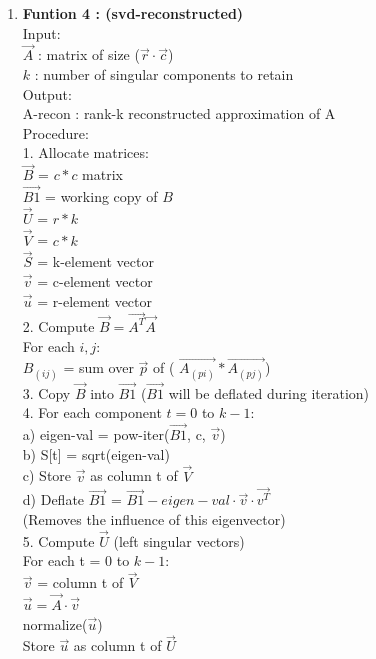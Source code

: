 \documentclass[journal,12pt,onecolumn]{IEEEtran}
\theoremstyle{remark}
\begin{document}
\begin{justify}
\begin{enumerate}
\item \textbf{Funtion 4 : (svd-reconstructed)}\\
Input:\\
  $\vec{A}$ : matrix of size ($\vec{r} \cdot \vec{c}$)\\
  $k$ : number of singular components to retain\\

Output:\\
  A-recon : rank-k reconstructed approximation of A\\
Procedure:\\
1. Allocate matrices:\\
      $\vec{B}$  = $c*c$ matrix\\
      $\vec{B1}$ = working copy of $B$\\
      $\vec{U}$  = $r*k$\\
      $\vec{V}$  = $c*k$\\
      $\vec{S}$  = k-element vector\\
      $\vec{v}$  = c-element vector\\
      $\vec{u}$  = r-element vector\\
2. Compute $\vec{B} = \vec{A^T} \vec{A}$\\
      For each $i,j$:\\
          $B_(ij)$ = sum over $\vec{p}$ of ( $\vec{A_(pi)} * \vec{A_(pj)} $)\\
3. Copy $\vec{B}$ into $\vec{B1}$  ($\vec{B1}$ will be deflated during iteration)\\
4. For each component $t = 0$ to $k-1$:\\
      a) eigen-val = pow-iter($\vec{B1}$, c, $\vec{v}$)\\
      b) S[t] = sqrt(eigen-val)\\
      c) Store $\vec{v}$ as column t of $\vec{V}$\\
      d) Deflate $\vec{B1}$ = $\vec{B1} - eigen-val\cdot\vec{v}\cdot\vec{v^T}$\\
         (Removes the influence of this eigenvector)\\
5. Compute $\vec{U}$ (left singular vectors)\\
      For each t = 0 to $k-1$:\\
          $\vec{v}$ = column t of $\vec{V}$\\
          $\vec{u} = \vec{A}\cdot \vec{v}$\\
          normalize($\vec{u}$)\\
          Store $\vec{u}$ as column t of $\vec{U}$\\

\end{enumerate}
\end{justify}
\end{document}
